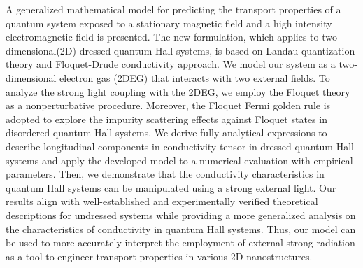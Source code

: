 A generalized mathematical model for predicting the transport properties of a quantum system exposed to a stationary magnetic field and a high intensity electromagnetic field is presented. The new formulation, which applies to two-dimensional(2D) dressed quantum Hall systems, is based on Landau quantization theory and Floquet-Drude conductivity approach.
We model our system as a two-dimensional electron gas (2DEG) that interacts with two external fields. To analyze the strong light coupling with the 2DEG, we employ the Floquet theory as a nonperturbative procedure. Moreover, the Floquet Fermi golden rule is adopted to explore the impurity scattering effects against Floquet states in disordered quantum Hall systems.
We derive fully analytical expressions to describe longitudinal components in conductivity tensor in dressed quantum Hall systems and apply the developed model to a numerical evaluation with empirical parameters. Then, we demonstrate that the conductivity characteristics in quantum Hall systems can be manipulated using a strong external light.
Our results align with well-established and experimentally
verified theoretical descriptions for undressed systems while providing a more generalized analysis on the characteristics of conductivity in quantum Hall systems.
Thus, our model can be used to more accurately interpret the employment of external strong radiation as a tool to engineer transport properties in various 2D nanostructures.
